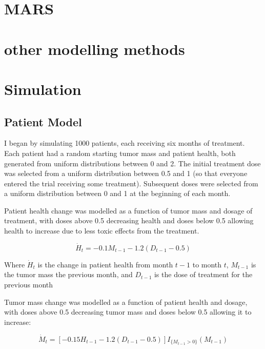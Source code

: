 \documentclass[12pt]{article}
\begin{document}

\section{MARS} %
\label{sec:mars}


\section{other modelling methods} %
\label{sec:other_modelling_methods}


\section{Simulation}

\subsection{Patient Model} %
\label{sub:vpm}

I began by simulating 1000 patients, each receiving six months of treatment. Each patient had a random starting tumor mass and patient health, both generated from uniform distributions between 0 and 2. The initial treatment dose was selected from a uniform distribution between 0.5 and 1 (so that everyone entered the trial receiving some treatment). Subsequent doses were selected from a uniform distribution between 0 and 1 at the beginning of each month.

Patient health change was modelled as a function of tumor mass and dosage of treatment, with doses above 0.5 decreasing health and doses below 0.5 allowing health to increase due to less toxic effects from the treatment.

\[
\dot{H}_{t} = - 0.1 M_{t-1} - 1.2 (D_{t-1} - 0.5)
\]

Where $\dot{H}_{t}$ is the change in patient health from month $t-1$ to month $t$, 
$M_{t-1}$ is the tumor mass the previous month, and 
$D_{t-1}$ is the dose of treatment for the previous month

Tumor mass change was modelled as a function of patient health and dosage, with doses above 0.5 decreasing tumor mass and doses below 0.5 allowing it to increase:

\[
\dot{M}_{t} = [- 0.15 H_{t-1} - 1.2 (D_{t-1} - 0.5)] I_{\{M_{t-1} > 0\}}(M_{t-1})
\]
\end{document}
